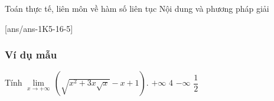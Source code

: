 \begin{dang}{Toán thực tế, liên môn về hàm số liên tục}
	Nội dung và phương pháp giải
\end{dang}
[ans/ans-1K5-16-5]
\subsubsection{Ví dụ mẫu}
\setcounter{vd}{0}
\begin{vd}%
	Tính $\underset{x\to +\infty}{\mathop{\lim}}\,\left( \sqrt{x^2+3x\sqrt{x}}-x+1 \right)$.
	\choice
	{\True $+\infty$}
	{$4$}
	{$-\infty$}
	{$\dfrac{1}{2}$}
\end{vd}



